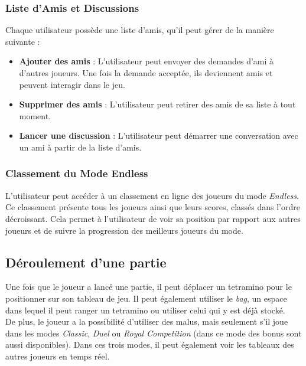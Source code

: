\documentclass{report}
\begin{document}
\subsubsection{Liste d'Amis et Discussions}

\noindent Chaque utilisateur possède une liste d'amis, qu'il peut gérer de la manière suivante :

\begin{itemize}
    \item \textbf{Ajouter des amis} : L'utilisateur peut envoyer des demandes d'ami à d'autres joueurs. Une fois la demande acceptée, ils deviennent amis et peuvent interagir dans le jeu.
    \item \textbf{Supprimer des amis} : L'utilisateur peut retirer des amis de sa liste à tout moment.
    \item \textbf{Lancer une discussion} : L'utilisateur peut démarrer une conversation avec un ami à partir de la liste d'amis.
\end{itemize}

\subsubsection{Classement du Mode Endless}

\noindent L'utilisateur peut accéder à un classement en ligne des joueurs du mode \emph{Endless}. Ce classement présente tous les joueurs ainsi que leurs scores, classés dans l'ordre décroissant. Cela permet à l'utilisateur de voir sa position par rapport aux autres joueurs et de suivre la progression des meilleurs joueurs du mode.





\subsection{Déroulement d’une partie}

\noindent Une fois que le joueur a lancé une partie, il peut déplacer un tetramino pour le positionner sur son tableau de jeu. Il peut également utiliser le \emph{bag}, un espace dans lequel il peut ranger un tetramino ou utiliser celui qui y est déjà stocké. \\

\noindent De plus, le joueur a la possibilité d'utiliser des malus, mais seulement s'il joue dans les modes \emph{Classic}, \emph{Duel} ou \emph{Royal Competition} (dans ce mode des bonus sont aussi disponibles). Dans ces trois modes, il peut également voir les tableaux des autres joueurs en temps réel.
\end{document}
